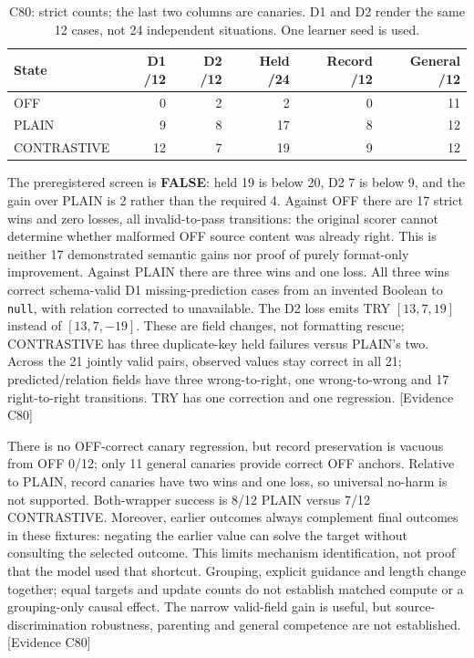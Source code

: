 \documentclass[11pt]{article}
\begin{document}
\begin{table}[htbp]
\centering\small
\begin{tabular}{lrrrrr}
\toprule
State & D1 /12 & D2 /12 & Held /24 & Record /12 & General /12 \\
\midrule
OFF & 0 & 2 & 2 & 0 & 11 \\
PLAIN & 9 & 8 & 17 & 8 & 12 \\
CONTRASTIVE & 12 & 7 & 19 & 9 & 12 \\
\bottomrule
\end{tabular}
\caption{C80: strict counts; the last two columns are canaries. D1 and D2 render
the same 12 cases, not 24 independent situations. One learner seed is used.}
\label{tab:bounded-contrastive}
\end{table}

The preregistered screen is \textbf{FALSE}: held 19 is below 20, D2 7 is below 9,
and the gain over PLAIN is 2 rather than the required 4. Against OFF there are
17 strict wins and zero losses, all invalid-to-pass transitions: the original
scorer cannot determine whether malformed OFF source content was already right.
This is neither 17 demonstrated semantic gains nor proof of purely format-only
improvement. Against PLAIN there are three wins and one loss. All three wins
correct schema-valid D1 missing-prediction cases from an invented Boolean to
\texttt{null}, with relation corrected to unavailable. The D2 loss emits TRY
$[13,7,19]$ instead of $[13,7,-19]$. These are field changes, not formatting rescue;
CONTRASTIVE has three duplicate-key held failures versus PLAIN's two.
Across the 21 jointly valid pairs, observed values stay correct in all 21;
predicted/relation fields have three wrong-to-right, one wrong-to-wrong and
17 right-to-right transitions. TRY has one correction and one regression.
\textsf{[Evidence C80]}

There is no OFF-correct canary regression, but record preservation is vacuous
from OFF 0/12; only 11 general canaries provide correct OFF anchors. Relative to
PLAIN, record canaries have two wins and one loss, so universal no-harm is not
supported. Both-wrapper success is 8/12 PLAIN versus 7/12 CONTRASTIVE. Moreover,
earlier outcomes always complement final outcomes in these fixtures: negating
the earlier value can solve the target without consulting the selected outcome.
This limits mechanism identification, not proof that the model used that shortcut.
Grouping, explicit guidance and length change together; equal targets and update
counts do not establish matched compute or a grouping-only causal effect.
The narrow valid-field gain is useful, but source-discrimination robustness,
parenting and general competence are not established. \textsf{[Evidence C80]}
\end{document}
